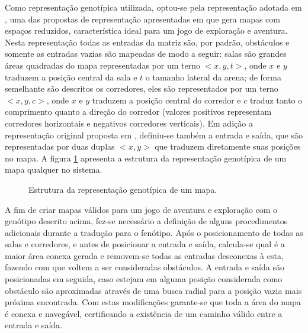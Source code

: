 Como representação genotípica utilizada, optou-se pela representação adotada em \cite{lanzi2014evolving}, uma das propostas de representação apresentadas em \cite{cardamone2011evolving} que gera mapas com espaços reduzidos, característica ideal para um jogo de exploração e aventura. Nesta representação todas as entradas da matriz são, por padrão, obstáculos e somente as entradas vazias são mapeadas de modo a seguir: salas são grandes áreas quadradas do mapa representadas por um terno $<x, y, t>$, onde $x$ e $y$ traduzem a posição central da sala e $t$ o tamanho lateral da arena; de forma semelhante são descritos os corredores, eles são representados por um terno $<x, y, c>$, onde $x$ e $y$ traduzem a posição central do corredor e $c$ traduz tanto o comprimento quanto a direção do corredor (valores positivos representam corredores horizontais e negativos corredores verticais). Em adição a representação original proposta em \cite{cardamone2011evolving}, definiu-se também a entrada e saída, que são representadas por duas duplas $<x, y>$ que traduzem diretamente suas posições no mapa. A figura \ref{fig:dev_genotype} apresenta a estrutura da representação genotípica de um mapa qualquer no sistema.

\begin{figure}[htb]
    \footnotesize
    \sffamily
	\begin{center}
		\caption{Estrutura da representação genotípica de um mapa.}
		\label{fig:dev_genotype}
	\end{center}
\end{figure}

A fim de criar mapas válidos para um jogo de aventura e exploração com o genótipo descrito acima, fez-se necessário a definição de alguns procedimentos adicionais durante a tradução para o fenótipo. Após o posicionamento de todas as salas e corredores, e antes de posicionar a entrada e saída, calcula-se qual é a maior área conexa gerada e removem-se todas as entradas desconexas à esta, fazendo com que voltem a ser consideradas obstáculos. A entrada e saída são posicionadas em seguida, caso estejam em alguma posição considerada como obstáculo são aproximadas através de uma busca radial para a posição vazia mais próxima encontrada. Com estas modificações garante-se que toda a área do mapa é conexa e navegável, certificando a existência de um caminho válido entre a entrada e saída.

